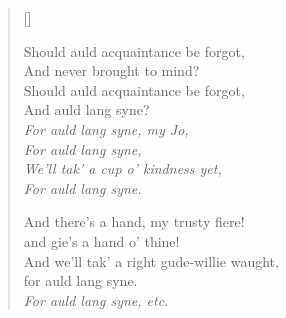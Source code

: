 \documentclass{tartan}
\begin{document}
\clearpage
\settowidth{\versewidth}{And we'll tak' a right gude-willie waught,}
\begin{verse}[\versewidth]
\begin{altverse}
Should auld acquaintance be forgot,\\
And never brought to mind?\\
Should auld acquaintance be forgot,\\
And auld lang syne?\\
\textit{For auld lang syne, my Jo,\\
For auld lang syne,\\
We'll tak' a cup o' kindness yet,\\
For auld lang syne.}
\end{altverse}

\begin{altverse}
And there's a hand, my trusty fiere!\\
and gie's a hand o' thine!\\
And we'll tak' a right gude-willie waught,\\
for auld lang syne.\\
\textit{For auld lang syne, etc.}
\end{altverse}
\end{verse}
\end{document}
